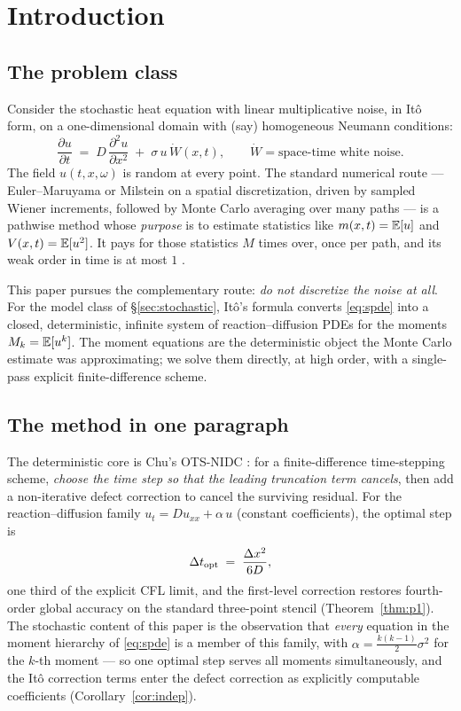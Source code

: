 \section{Introduction}\label{sec:intro}

\subsection{The problem class}

Consider the stochastic heat equation with linear multiplicative noise, in It\^o
form, on a one-dimensional domain with (say) homogeneous Neumann conditions:
\begin{equation}\label{eq:spde}
\frac{\partial u}{\partial t} \;=\; D\,\frac{\partial^2 u}{\partial x^2}
\;+\; \sigma\, u\, \dot W(x,t),
\qquad \dot W = \text{space-time white noise}.
\end{equation}
The field $u(t,x,\omega)$ is random at every point. The standard numerical
route --- Euler--Maruyama or Milstein on a spatial discretization, driven by
sampled Wiener increments, followed by Monte Carlo averaging over many paths ---
is a pathwise method whose \emph{purpose} is to estimate statistics like
$m(x,t)=\mathbb{E}[u]$ and $V(x,t)=\mathbb{E}[u^2]$. It pays for those statistics $M$ times over,
once per path, and its weak order in time is at most $1$ \citep{lord2014,kloeden1992}.

This paper pursues the complementary route: \emph{do not discretize the noise at
all}. For the model class of \S\ref{sec:stochastic}, It\^o's formula converts
\eqref{eq:spde} into a closed, deterministic, infinite system of reaction--diffusion
PDEs for the moments $M_k=\mathbb{E}[u^k]$. The moment equations are the deterministic
object the Monte Carlo estimate was approximating; we solve them directly, at high
order, with a single-pass explicit finite-difference scheme.

\subsection{The method in one paragraph}

The deterministic core is Chu's OTS-NIDC \citep{chu2011}: for a finite-difference
time-stepping scheme, \emph{choose the time step so that the leading truncation
term cancels}, then add a non-iterative defect correction to cancel the surviving
residual. For the reaction--diffusion family
$u_t = D u_{xx} + \alpha\, u$ (constant coefficients), the optimal step is
\begin{equation}\label{eq:dtopt}
\Delta t_{\mathrm{opt}} \;=\; \frac{\Delta x^2}{6D},
\end{equation}
one third of the explicit CFL limit, and the first-level correction restores
fourth-order global accuracy on the standard three-point stencil
(Theorem~\ref{thm:p1}). The stochastic content of this paper is the observation
that \emph{every} equation in the moment hierarchy of \eqref{eq:spde} is a member
of this family, with $\alpha = \frac{k(k-1)}{2}\sigma^2$ for the $k$-th moment ---
so one optimal step serves all moments simultaneously, and the It\^o correction
terms enter the defect correction as explicitly computable coefficients
(Corollary~\ref{cor:indep}).

